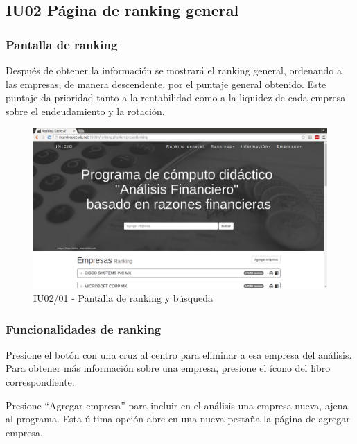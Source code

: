 \hypertarget{IU02}{\subsection{IU02 Página de ranking general}}


    \subsubsection{Pantalla de ranking}

    Después de obtener la información se mostrará el ranking general,
    ordenando a las empresas, de manera descendente, por el puntaje general obtenido.
    Este puntaje da prioridad tanto a la rentabilidad
    como a la liquidez de cada empresa sobre el endeudamiento y la rotación.

    \begin{figure}[H]
        \begin{center}
            \includegraphics[scale=0.3]{pantallas/Ranking1}
            \caption{IU02/01 - Pantalla de ranking y búsqueda}
        \end{center}
    \end{figure}


    \subsubsection{Funcionalidades de ranking}

    Presione el botón con una cruz al centro para eliminar a esa empresa del análisis.
    Para obtener más información sobre una empresa, presione el ícono del libro correspondiente.

    Presione ``Agregar empresa'' para incluir en el análisis una empresa nueva, ajena al programa.
    Esta última opción abre en una nueva pestaña la página de agregar empresa.

